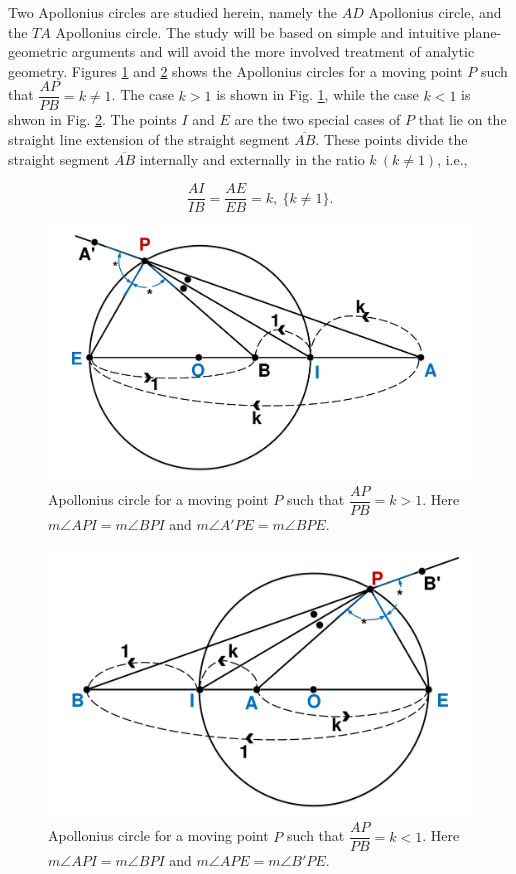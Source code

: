 Two Apollonius circles are studied herein, namely the $AD$ Apollonius circle, and the $TA$ Apollonius circle. The study will be based on simple and intuitive plane-geometric arguments and will avoid the more involved treatment of analytic geometry. Figures \ref{1} and \ref{2} shows the Apollonius circles for a moving point $P$ such that $\dfrac{AP}{PB}=k\neq1$. The case $k>1$ is shown in Fig. \ref{1}, while the case $k<1$ is shwon in Fig. \ref{2}. The points $I$ and $E$ are the two special cases of $P$ that lie on the straight line extension of the straight segment $\overline{AB}$. These points divide the straight segment $\overline{AB}$ internally and externally in the ratio $k\ (k\neq1)$, i.e., 

\begin{equation}
\boxed{
	\dfrac{AI}{IB}=\dfrac{AE}{EB}=k,\ \{k\neq1\}.}
\label{eqn:kratio}
\end{equation} 


\begin{figure}[htb]
	\centering
	\includegraphics[scale = 0.5]{fig/drawing1.pdf}
	\caption{Apollonius circle for a moving point $P$ such that $\dfrac{AP}{PB}=k>1$. Here $m\angle API = m\angle BPI$ and $m\angle A'PE = m\angle BPE$.}
	\label{1}
\end{figure}

\begin{figure}[htb]
	\centering
	\includegraphics[scale = 0.5]{fig/drawing2.pdf}
	\caption{Apollonius circle for a moving point $P$ such that $\dfrac{AP}{PB}=k<1$. Here $m\angle API = m\angle BPI$ and $m\angle APE = m\angle B'PE$.}
	\label{2}
\end{figure}

